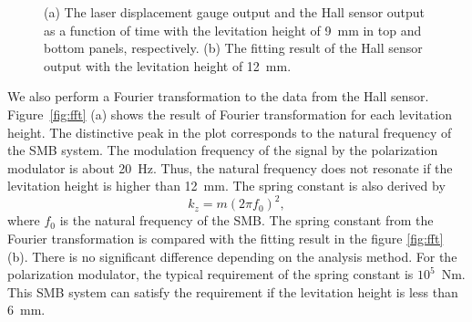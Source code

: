 \documentclass[a4paper,11pt]{jpconf}
\begin{document}
\begin{figure}[htbp]
  \centering
  \begin{minipage}{0.45\hsize}
  \end{minipage}
  \begin{minipage}{0.1\hsize}
  \end{minipage}
  \begin{minipage}{0.45\hsize}
    \centering
  \end{minipage}
  \caption{(a) The laser displacement gauge output and the Hall sensor output as a function of time with the levitation height of 9~mm in top and bottom panels, respectively.
    (b) The fitting result of the Hall sensor output with the levitation height of 12~mm.}
  \label{fig:vibration}
\end{figure}

We also perform a Fourier transformation to the data from the Hall sensor.
Figure~\ref{fig:fft} (a) shows the result of Fourier transformation for each levitation height.
The distinctive peak in the plot corresponds to the natural frequency of the SMB system.
The modulation frequency of the signal by the polarization modulator is about 20~Hz.
Thus, the natural frequency does not resonate if the levitation height is higher than 12~mm.
The spring constant is also derived by
\begin{equation}
  k_{z} = m (2 \pi f_{0})^{2},
\end{equation}
where $f_{0}$ is the natural frequency of the SMB.
The spring constant from the Fourier transformation is compared with the fitting result in the figure \ref{fig:fft} (b).
There is no significant difference depending on the analysis method.
For the polarization modulator, the typical requirement of the spring constant is $10^{5}$~Nm.
This SMB system can satisfy the requirement if the levitation height is less than 6~mm.
\end{document}
